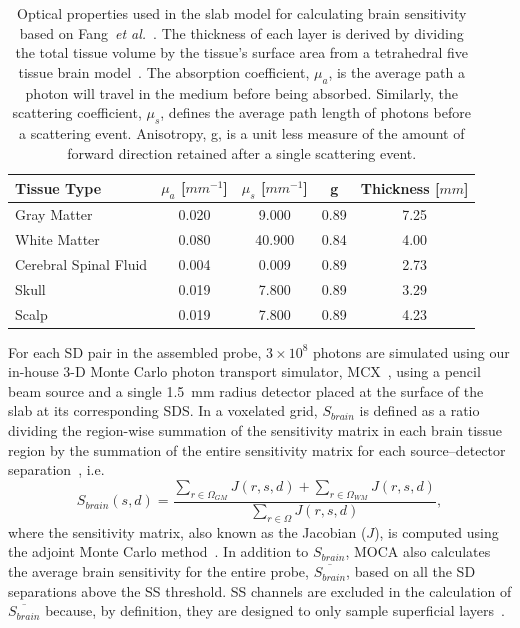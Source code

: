 \begin{table}
\centering
\caption{Optical properties used in the slab model for calculating brain sensitivity based on Fang~\emph{et al.}~\cite{Fang2010}. The thickness of each layer is derived by dividing the total tissue volume by the tissue's surface area from a tetrahedral five tissue brain model~\cite{Sanchez2012}. The absorption coefficient, $\mu_{a}$, is the average path a photon will travel in the medium before being absorbed. Similarly, the scattering coefficient, $\mu_{s}$, defines the average path length of photons before a scattering event. Anisotropy, g, is a unit less measure of the amount of forward direction retained after a single scattering event.}
\label{tab:opticalproperties}
\begin{tabular}{@{}lcccc@{}}
\toprule
Tissue Type  & $\mu_{a}$ [$mm^{-1}$] & $\mu_{s}$ [$mm^{-1}$] & g    & Thickness [$mm$] \\ \midrule
Gray Matter                     & 0.020      & 9.000      & 0.89 & 7.25           \\
White Matter                    & 0.080      & 40.900     & 0.84 & 4.00           \\
Cerebral Spinal Fluid           & 0.004      & 0.009      & 0.89 & 2.73           \\
Skull                           & 0.019      & 7.800      & 0.89 & 3.29           \\
Scalp                           & 0.019      & 7.800      & 0.89 & 4.23           \\ \bottomrule
\end{tabular}
\end{table}

For each SD pair in the assembled probe, $3\times10^{8}$ photons are simulated using our in-house 3-D Monte Carlo photon transport simulator, MCX~\cite{Fang2009}, using a pencil beam source and a single 1.5~mm radius detector placed at the surface of the slab at its corresponding SDS. In a voxelated grid, $S_{brain}$ is defined as a ratio dividing the region-wise summation of the sensitivity matrix in each brain tissue region by the summation of the entire sensitivity matrix for each source–detector separation~\cite{Brigadoi2015}, i.e.
\begin{equation}
\label{eq:fov}
S_{brain}(s,d) = \frac{\sum_{r\in\Omega_{GM}}J(r,s,d) + \sum_{r\in\Omega_{WM}}J(r,s,d)} {\sum_{r\in\Omega}J(r,s,d)},
\end{equation}
where the sensitivity matrix, also known as the Jacobian ($J$), is computed using the adjoint Monte Carlo method~\cite{Yao2018}. In addition to $S_{brain}$, MOCA also calculates the average brain sensitivity for the entire probe, $\overline{S_{brain}}$, based on all the SD separations above the SS threshold. SS channels are excluded in the calculation of $\overline{S_{brain}}$ because, by definition, they are designed to only sample superficial layers~\cite{Brigadoi2015}.

